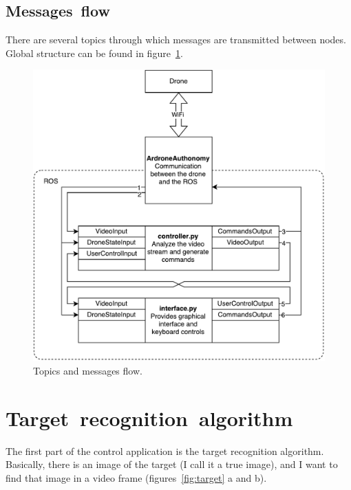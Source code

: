 \documentclass[12pt]{article}
\begin{document}
    \subsection{Messages~flow}

    There are several topics through which messages are transmitted between nodes.
    Global structure can be found in figure~\ref{fig:topics}.

    \begin{figure}[htbp]
        \noindent\centering
            \includegraphics[width=\textwidth]{topics.pdf}
        \caption{Topics and messages flow.} %
        \label{fig:topics}
    \end{figure}

    \section{Target~recognition~algorithm}
    \label{sec:target_recognition_algorithm}

    The first part of the control application is the target recognition
    algorithm. Basically, there is an image of the target (I call it a true image),
    and I want to find that image in a video frame (figures~\ref{fig:target} a and b).
\end{document}
